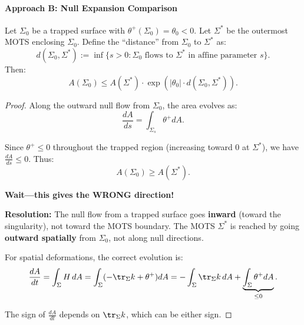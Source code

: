 \paragraph{Approach B: Null Expansion Comparison}

\begin{theorem}\label{thm:trappedmots}
Let $\Sigma_0$ be a trapped surface with $\theta^+(\Sigma_0) = \theta_0 < 0$. Let $\Sigma^*$ be the outermost MOTS enclosing $\Sigma_0$. Define the ``distance'' from $\Sigma_0$ to $\Sigma^*$ as:
\begin{equation}
    d(\Sigma_0, \Sigma^*) := \inf\{s > 0 : \Sigma_0 \text{ flows to } \Sigma^* \text{ in affine parameter } s\}.
\end{equation}
Then:
\begin{equation}
    A(\Sigma_0) \leq A(\Sigma^*) \cdot \exp\left(|\theta_0| \cdot d(\Sigma_0, \Sigma^*)\right).
\end{equation}
\end{theorem}

\begin{proof}
Along the outward null flow from $\Sigma_0$, the area evolves as:
\begin{equation}
    \frac{dA}{ds} = \int_{\Sigma_s} \theta^+ dA.
\end{equation}

Since $\theta^+ \leq 0$ throughout the trapped region (increasing toward 0 at $\Sigma^*$), we have $\frac{dA}{ds} \leq 0$. Thus:
\begin{equation}
    A(\Sigma_0) \geq A(\Sigma^*).
\end{equation}

\textbf{Wait---this gives the WRONG direction!}

\textbf{Resolution:} The null flow from a trapped surface goes \textbf{inward} (toward the singularity), not toward the MOTS boundary. The MOTS $\Sigma^*$ is reached by going \textbf{outward spatially} from $\Sigma_0$, not along null directions.

For spatial deformations, the correct evolution is:
\begin{equation}
    \frac{dA}{dt} = \int_\Sigma H \, dA = \int_\Sigma (-\tr_\Sigma k + \theta^+) dA = -\int_\Sigma \tr_\Sigma k \, dA + \underbrace{\int_\Sigma \theta^+ dA}_{\leq 0}.
\end{equation}

The sign of $\frac{dA}{dt}$ depends on $\tr_\Sigma k$, which can be either sign.
\end{proof}

